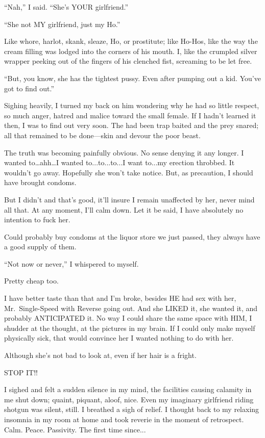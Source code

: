 ``Nah,'' I said. ``She's YOUR girlfriend.''

``She not MY girlfriend, just my Ho.''

Like whore, harlot, skank, sleaze, Ho, or prostitute; like Ho-Hos, like
the way the cream filling was lodged into the corners of his mouth. I,
like the crumpled silver wrapper peeking out of the fingers of his
clenched fist, screaming to be let free.

``But, you know, she has the tightest pussy. Even after pumping out a
kid. You've got to find out.''

Sighing heavily, I turned my back on him wondering why he had so little
respect, so much anger, hatred and malice toward the small female. If I
hadn't learned it then, I was to find out very soon. The had been trap
baited and the prey snared; all that remained to be done---skin and
devour the poor beast.

The truth was becoming painfully obvious. No sense denying it any
longer. I wanted to\ldots ahh\ldots I wanted to...to...to...I want
to...my erection throbbed. It wouldn't go away. Hopefully she won't take
notice. But, as precaution, I should have brought condoms.

But I didn't and that's good, it'll insure I remain unaffected by her,
never mind all that. At any moment, I'll calm down. Let it be said, I
have absolutely no intention to fuck her.

Could probably buy condoms at the liquor store we just passed, they
always have a good supply of them.

``Not now or never,'' I whispered to myself.

Pretty cheap too.

I have better taste than that and I'm broke, besides HE had sex with
her, Mr.~Single-Speed with Reverse going out. And she LIKED it, she
wanted it, and probably ANTICIPATED it. No way I could share the same
space with HIM, I shudder at the thought, at the pictures in my brain.
If I could only make myself physically sick, that would convince her I
wanted nothing to do with her.

Although she's not bad to look at, even if her hair is a fright.

STOP IT!!

I sighed and felt a sudden silence in my mind, the facilities causing
calamity in me shut down; quaint, piquant, aloof, nice. Even my
imaginary girlfriend riding shotgun was silent, still. I breathed a sigh
of relief. I thought back to my relaxing insomnia in my room at home and
took reverie in the moment of retrospect. Calm. Peace. Passivity. The
first time since...

